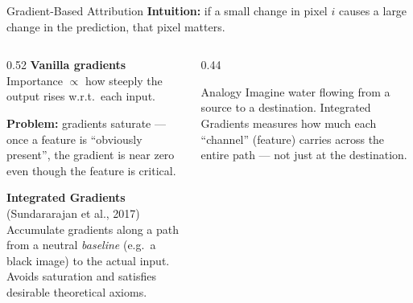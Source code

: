 \documentclass[aspectratio=169]{beamer}
\begin{document}
\begin{frame}{Gradient-Based Attribution}
  \textbf{Intuition:} if a small change in pixel $i$ causes a large change
  in the prediction, that pixel matters.

  \vspace{0.5em}
  \begin{columns}[T]
    \begin{column}{0.52\textwidth}
      \textbf{Vanilla gradients}\\
      Importance $\propto$ how steeply the output rises w.r.t.\ each input.

      \vspace{0.5em}
      \textbf{Problem:} gradients saturate —
      once a feature is ``obviously present'', the gradient is near zero
      even though the feature is critical.

      \vspace{0.7em}
      \textbf{Integrated Gradients} (Sundararajan et al., 2017)\\
      Accumulate gradients along a path from a neutral \emph{baseline}
      (e.g.\ a black image) to the actual input.
      Avoids saturation and satisfies desirable theoretical axioms.
    \end{column}
    \begin{column}{0.44\textwidth}
      \begin{exampleblock}{Analogy}
        Imagine water flowing from a source to a destination.
        Integrated Gradients measures how much each ``channel''
        (feature) carries across the entire path —
        not just at the destination.
      \end{exampleblock}
    \end{column}
  \end{columns}
\end{frame}
\end{document}
